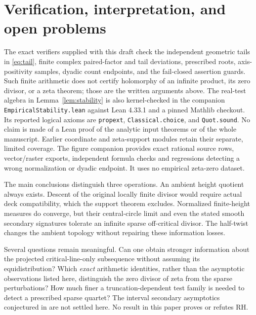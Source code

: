 \documentclass[11pt,a4paper]{article}
\theoremstyle{definition}
\theoremstyle{remark}
\begin{document}
\section{Verification, interpretation, and open problems}

The exact verifiers supplied with this draft check the independent geometric
tails in \eqref{eq:tail}, finite complex paired-factor and tail deviations,
prescribed roots, axis-positivity samples, dyadic count endpoints, and the
fail-closed assertion guards. Such finite arithmetic does not certify holomorphy of an
infinite product, its zero divisor, or a zeta theorem; those are the written
arguments above. The real-test algebra in Lemma~\ref{lem:stability} is
also kernel-checked in the companion \texttt{EmpiricalStability.lean} against
Lean 4.33.1 and a pinned Mathlib checkout. Its reported logical axioms are
\texttt{propext}, \texttt{Classical.choice}, and \texttt{Quot.sound}.
No claim is made of a Lean proof of the analytic input theorems or of the
whole manuscript. Earlier coordinate and zeta-support modules retain their
separate, limited coverage. The figure companion provides exact rational
source rows, vector/raster exports, independent formula checks and
regressions detecting a wrong normalization or dyadic endpoint. It uses
no empirical zeta-zero dataset.

The main conclusions distinguish three operations. An ambient height
quotient always exists. Descent of the original locally finite divisor
would require actual deck compatibility, which the support theorem excludes.
Normalized finite-height measures do converge, but their central-circle
limit and even the stated smooth secondary signatures tolerate an infinite
sparse off-critical divisor. The half-twist changes the ambient topology
without repairing these information losses.

Several questions remain meaningful. Can one obtain stronger information
about the projected critical-line-only subsequence without assuming its
equidistribution? Which \emph{exact} arithmetic identities, rather than the
asymptotic observations listed here, distinguish the zero divisor of zeta
from the sparse perturbations? How much finer a truncation-dependent test
family is needed to detect a prescribed sparse quartet? The interval
secondary asymptotics conjectured in \cite{FZ,FSZ} are not settled here.
No result in this paper proves or refutes RH.
\end{document}
